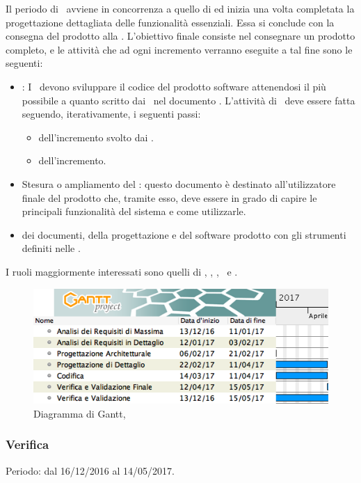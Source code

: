Il periodo di \COD\ avviene in concorrenza a quello di \PD ed inizia una volta completata la progettazione dettagliata delle funzionalità essenziali. Essa si conclude con la consegna del prodotto alla \RQ. L'obiettivo finale consiste nel consegnare un prodotto completo, e le attività che ad ogni incremento verranno eseguite a tal fine sono le seguenti:
\begin{itemize}
	\item \COD: I \ProgrP\ devono sviluppare il codice del prodotto software attenendosi il più possibile a quanto scritto dai \ProgP\ nel documento \DDP. L'attività di \COD\ deve essere fatta seguendo, iterativamente, i seguenti passi:
			\begin{itemize}
				\item {} dell'incremento svolto dai \ProgP.
				\item {} dell'incremento.
			\end{itemize}
	\item Stesura o ampliamento del \MU: questo documento è destinato all'utilizzatore finale del prodotto che, tramite esso, deve essere in grado di capire le principali funzionalità del sistema e come utilizzarle.
	\item {} dei documenti, della progettazione e del software prodotto con gli strumenti definiti nelle \NdP.
\end{itemize}
I ruoli maggiormente interessati sono quelli di \Am, \Pm, \Prog, \Progr\ e \Ver.

 \begin{figure}[H]
	\centering 
	\includegraphics[scale=0.5]{Immagini/Gantt/COD.png}
	\caption{Diagramma di Gantt, \COD}
\end{figure}

\subsubsection{Verifica}
Periodo: dal 16/12/2016 al 14/05/2017.\\

